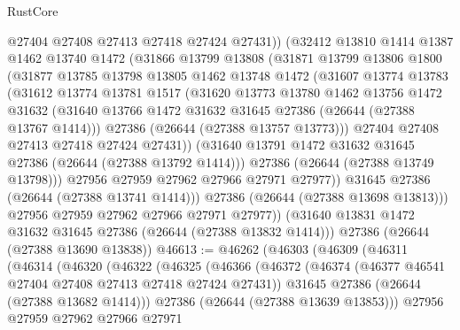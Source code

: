 \begin{lexlean}{RustCore}
\begin{coremodule}
              @27404
              @27408
              @27413
              @27418
              @27424
              @27431))
          (@32412
            @13810
            @1414
            @1387
            @1462
            @13740
            @1472
            (@31866
              @13799
              @13808
              (@31871
                @13799
                @13806
                @1800
                (@31877
                  @13785
                  @13798
                  @13805
                  @1462
                  @13748
                  @1472
                  (@31607
                    @13774
                    @13783
                    (@31612
                      @13774
                      @13781
                      @1517
                      (@31620
                        @13773
                        @13780
                        @1462
                        @13756
                        @1472
                        @31632
                        (@31640 @13766 @1472 @31632 @31645 @27386 (@26644 (@27388 @13767 @1414)))
                        @27386
                        (@26644 (@27388 @13757 @13773)))
                      @27404
                      @27408
                      @27413
                      @27418
                      @27424
                      @27431))
                  (@31640 @13791 @1472 @31632 @31645 @27386 (@26644 (@27388 @13792 @1414)))
                  @27386
                  (@26644 (@27388 @13749 @13798)))
                @27956
                @27959
                @27962
                @27966
                @27971
                @27977))
            @31645
            @27386
            (@26644 (@27388 @13741 @1414)))
          @27386
          (@26644 (@27388 @13698 @13813)))
        @27956
        @27959
        @27962
        @27966
        @27971
        @27977))
    (@31640 @13831 @1472 @31632 @31645 @27386 (@26644 (@27388 @13832 @1414)))
    @27386
    (@26644 (@27388 @13690 @13838))
@46613 := @46262
    (@46303
      (@46309
        (@46311
          (@46314
            (@46320
              (@46322
                (@46325
                  (@46366
                    (@46372
                      (@46374 (@46377 @46541 @27404 @27408 @27413 @27418 @27424 @27431))
                      @31645
                      @27386
                      (@26644 (@27388 @13682 @1414)))
                    @27386
                    (@26644 (@27388 @13639 @13853)))
                  @27956
                  @27959
                  @27962
                  @27966
                  @27971

\end{coremodule}
\end{lexlean}
